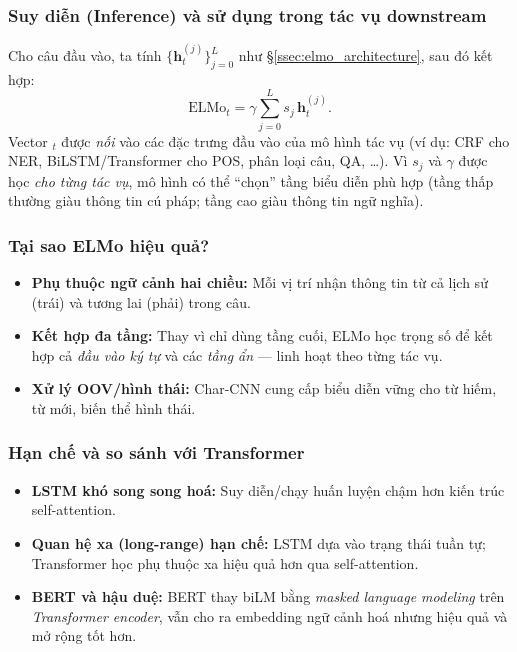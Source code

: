 \subsubsection{Suy diễn (Inference) và sử dụng trong tác vụ downstream}
\label{ssec:elmo_inference}

Cho câu đầu vào, ta tính $\{\mathbf{h}_t^{(j)}\}_{j=0}^{L}$ như \S\ref{ssec:elmo_architecture}, sau đó kết hợp:
\[
  \text{ELMo}_t = \gamma \sum_{j=0}^{L} s_j\, \mathbf{h}_t^{(j)}.
\]
Vector $_t$ được \emph{nối} vào các đặc trưng đầu vào của mô hình tác vụ (ví dụ: CRF cho NER, BiLSTM/Transformer cho POS, phân loại câu, QA, \dots). Vì $s_j$ và $\gamma$ được học \emph{cho từng tác vụ}, mô hình có thể “chọn” tầng biểu diễn phù hợp (tầng thấp thường giàu thông tin cú pháp; tầng cao giàu thông tin ngữ nghĩa).

\subsubsection{Tại sao ELMo hiệu quả?}
\label{ssec:elmo_why}

\begin{itemize}
  \item \textbf{Phụ thuộc ngữ cảnh hai chiều:} Mỗi vị trí nhận thông tin từ cả lịch sử (trái) và tương lai (phải) trong câu.
  \item \textbf{Kết hợp đa tầng:} Thay vì chỉ dùng tầng cuối, ELMo học trọng số để kết hợp cả \emph{đầu vào ký tự} và các \emph{tầng ẩn} --- linh hoạt theo từng tác vụ.
  \item \textbf{Xử lý OOV/hình thái:} Char-CNN cung cấp biểu diễn vững cho từ hiếm, từ mới, biến thể hình thái.
\end{itemize}

\subsubsection{Hạn chế và so sánh với Transformer}
\label{ssec:elmo_limits}

\begin{itemize}
  \item \textbf{LSTM khó song song hoá:} Suy diễn/chạy huấn luyện chậm hơn kiến trúc self-attention.
  \item \textbf{Quan hệ xa (long-range) hạn chế:} LSTM dựa vào trạng thái tuần tự; Transformer học phụ thuộc xa hiệu quả hơn qua self-attention.
  \item \textbf{BERT và hậu duệ:} BERT thay biLM bằng \emph{masked language modeling} trên \emph{Transformer encoder}, vẫn cho ra embedding ngữ cảnh hoá nhưng hiệu quả và mở rộng tốt hơn.
\end{itemize}

